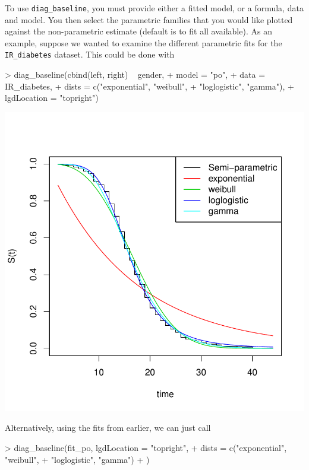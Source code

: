 \documentclass[a4paper]{article}
\begin{document}
To use \texttt{diag\_baseline}, you must provide either a fitted model, or a formula, data and model. You then select the parametric families that you would like plotted against the non-parametric estimate (default is to fit all available). As an example, suppose we wanted to examine the different parametric fits for the \texttt{IR\_diabetes} dataset. This could be done with 
  
\begin{Schunk}
\begin{Sinput}
> diag_baseline(cbind(left, right) ~ gender,
+     model = "po",
+     data = IR_diabetes,
+     dists = c("exponential", "weibull", 
+               "loglogistic", "gamma"),
+     lgdLocation = "topright")
\end{Sinput}
\end{Schunk}
\includegraphics{icenReg-024}

Alternatively, using the fits from earlier, we can just call
  
\begin{Schunk}
\begin{Sinput}
> diag_baseline(fit_po, lgdLocation = "topright",
+               dists = c("exponential", "weibull", 
+                         "loglogistic", "gamma")
+               )
\end{Sinput}
\end{Schunk}
\end{document}
